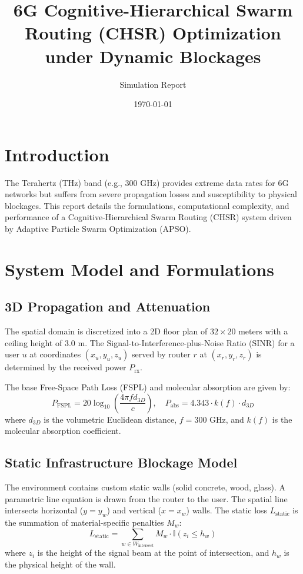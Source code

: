 \documentclass[10pt, a4paper]{article}
\title{\textbf{6G Cognitive-Hierarchical Swarm Routing (CHSR) Optimization under Dynamic Blockages}}
\author{Simulation Report}
\date{\today}
\begin{document}
\maketitle

\section{Introduction}
The Terahertz (THz) band (e.g., 300 GHz) provides extreme data rates for 6G networks but suffers from severe propagation losses and susceptibility to physical blockages. This report details the formulations, computational complexity, and performance of a Cognitive-Hierarchical Swarm Routing (CHSR) system driven by Adaptive Particle Swarm Optimization (APSO).

\section{System Model and Formulations}
\subsection{3D Propagation and Attenuation}
The spatial domain is discretized into a 2D floor plan of $32 \times 20$ meters with a ceiling height of $3.0$ m. The Signal-to-Interference-plus-Noise Ratio (SINR) for a user $u$ at coordinates $(x_u, y_u, z_u)$ served by router $r$ at $(x_r, y_r, z_r)$ is determined by the received power $P_{\text{rx}}$.

The base Free-Space Path Loss (FSPL) and molecular absorption are given by:
\begin{equation}
    P_{\text{FSPL}} = 20 \log_{10} \left( \frac{4 \pi f d_{3D}}{c} \right), \quad P_{\text{abs}} = 4.343 \cdot k(f) \cdot d_{3D}
\end{equation}
where $d_{3D}$ is the volumetric Euclidean distance, $f=300$ GHz, and $k(f)$ is the molecular absorption coefficient.

\subsection{Static Infrastructure Blockage Model}
The environment contains custom static walls (solid concrete, wood, glass). A parametric line equation is drawn from the router to the user. The spatial line intersects horizontal ($y=y_w$) and vertical ($x=x_w$) walls. The static loss $L_{\text{static}}$ is the summation of material-specific penalties $M_w$:
\begin{equation}
    L_{\text{static}} = \sum_{w \in W_{\text{intersect}}} M_w \cdot \mathbb{I}(z_i \leq h_w)
\end{equation}
where $z_i$ is the height of the signal beam at the point of intersection, and $h_w$ is the physical height of the wall. 
\end{document}
